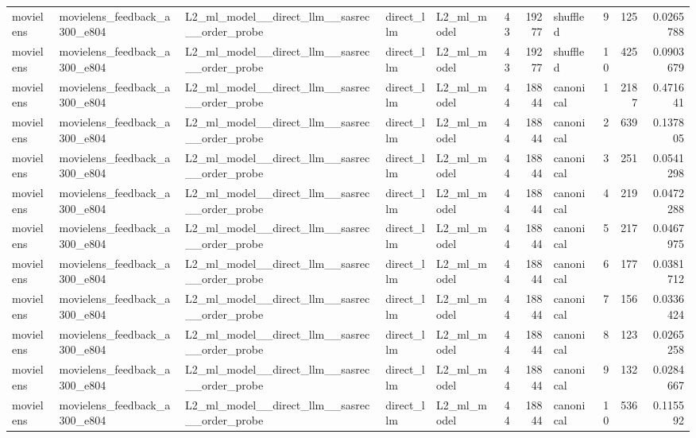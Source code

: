 \begin{table}[htbp!]
\begin{tabular}{lllllrrlrrr}
movielens & movielens\_feedback\_a300\_e804 & L2\_ml\_model\_\_direct\_llm\_\_sasrec\_\_order\_probe & direct\_llm & L2\_ml\_model & 43 & 19277 & shuffled & 9 & 125 & 0.0265788 \\
movielens & movielens\_feedback\_a300\_e804 & L2\_ml\_model\_\_direct\_llm\_\_sasrec\_\_order\_probe & direct\_llm & L2\_ml\_model & 43 & 19277 & shuffled & 10 & 425 & 0.0903679 \\
movielens & movielens\_feedback\_a300\_e804 & L2\_ml\_model\_\_direct\_llm\_\_sasrec\_\_order\_probe & direct\_llm & L2\_ml\_model & 44 & 18844 & canonical & 1 & 2187 & 0.471641 \\
movielens & movielens\_feedback\_a300\_e804 & L2\_ml\_model\_\_direct\_llm\_\_sasrec\_\_order\_probe & direct\_llm & L2\_ml\_model & 44 & 18844 & canonical & 2 & 639 & 0.137805 \\
movielens & movielens\_feedback\_a300\_e804 & L2\_ml\_model\_\_direct\_llm\_\_sasrec\_\_order\_probe & direct\_llm & L2\_ml\_model & 44 & 18844 & canonical & 3 & 251 & 0.0541298 \\
movielens & movielens\_feedback\_a300\_e804 & L2\_ml\_model\_\_direct\_llm\_\_sasrec\_\_order\_probe & direct\_llm & L2\_ml\_model & 44 & 18844 & canonical & 4 & 219 & 0.0472288 \\
movielens & movielens\_feedback\_a300\_e804 & L2\_ml\_model\_\_direct\_llm\_\_sasrec\_\_order\_probe & direct\_llm & L2\_ml\_model & 44 & 18844 & canonical & 5 & 217 & 0.0467975 \\
movielens & movielens\_feedback\_a300\_e804 & L2\_ml\_model\_\_direct\_llm\_\_sasrec\_\_order\_probe & direct\_llm & L2\_ml\_model & 44 & 18844 & canonical & 6 & 177 & 0.0381712 \\
movielens & movielens\_feedback\_a300\_e804 & L2\_ml\_model\_\_direct\_llm\_\_sasrec\_\_order\_probe & direct\_llm & L2\_ml\_model & 44 & 18844 & canonical & 7 & 156 & 0.0336424 \\
movielens & movielens\_feedback\_a300\_e804 & L2\_ml\_model\_\_direct\_llm\_\_sasrec\_\_order\_probe & direct\_llm & L2\_ml\_model & 44 & 18844 & canonical & 8 & 123 & 0.0265258 \\
movielens & movielens\_feedback\_a300\_e804 & L2\_ml\_model\_\_direct\_llm\_\_sasrec\_\_order\_probe & direct\_llm & L2\_ml\_model & 44 & 18844 & canonical & 9 & 132 & 0.0284667 \\
movielens & movielens\_feedback\_a300\_e804 & L2\_ml\_model\_\_direct\_llm\_\_sasrec\_\_order\_probe & direct\_llm & L2\_ml\_model & 44 & 18844 & canonical & 10 & 536 & 0.115592 \\

\end{tabular}
\end{table}
